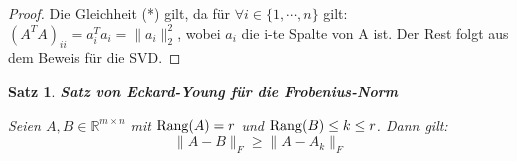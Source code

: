 \documentclass{article}
\newcommand{\R}[0]{\mathbb{R}}
\newtheorem{thm}{Satz}
\begin{document}
\begin{proof}
    Die Gleichheit (*) gilt, da für $\forall i\in \{1, \cdots, n\}$ gilt: $(A^TA)_{ii} = a_i^Ta_i = \lVert a_i \rVert^2_2$, wobei $a_i$ die i-te Spalte von A ist.
    Der Rest folgt aus dem Beweis für die SVD.
\end{proof}

\begin{thm} \textbf{Satz von Eckard-Young für die Frobenius-Norm}

    Seien $A, B \in \R^{m \times n}$ mit ${\rm Rang}(A) = r$ und ${\rm Rang}(B) \leq k \leq r$. Dann gilt:
    \begin{equation}
        \lVert A - B \rVert_F \geq \lVert A - A_k \rVert_F
    \end{equation}
\end{thm}
\end{document}
